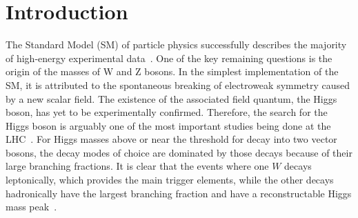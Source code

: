 \section{Introduction}
\label{sec:intro}

The Standard Model (SM) of particle physics successfully describes the majority of high-energy
experimental data~\cite{pdg}. One of the key remaining questions is the origin of the masses of
W and Z bosons.  In the simplest implementation of the SM, it is attributed to the spontaneous
breaking of electroweak symmetry caused by a new scalar field. %
The existence of the associated field quantum, the Higgs boson, has yet to be experimentally confirmed.
Therefore, the search for the Higgs boson is arguably one of the most
important studies being done at the LHC~\cite{lhcmachine}. For Higgs
masses above or near the threshold for decay into two vector bosons,
the decay modes of choice are dominated by those decays because of
their large branching fractions.
It is clear that the events where one $W$ decays leptonically, which
provides the main trigger elements, while the other decays
hadronically have the largest branching fraction and have a
reconstructable Higgs mass peak~\cite{intro2}. 

